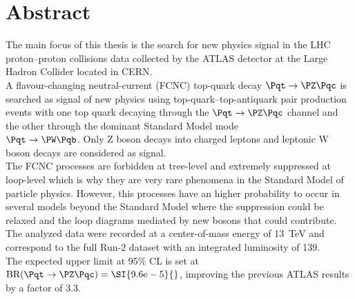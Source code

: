 \chapter*{Abstract}        %

\vspace{-1cm}
The main focus of this thesis is the search for new physics signal in the
LHC proton–proton collisions data collected by the ATLAS detector at 
the Large Hadron Collider located in CERN.\\
A flavour-changing neutral-current (FCNC) top-quark decay
$\Pqt\rightarrow\PZ\Pqc$ is searched as signal of new physics using 
top-quark–top-antiquark pair production events with one top quark 
decaying through the $\Pqt\rightarrow\PZ\Pqc$ channel and the other 
through the dominant Standard Model mode\\ $\Pqt\rightarrow\PW\Pqb$. 
Only Z boson decays into charged leptons and leptonic W boson decays 
are considered as signal.\\
The FCNC processes are forbidden at tree-level and extremely suppressed at loop-level 
which is why they are very rare phenomena in the Standard Model of particle physics.
However, this processes have an higher probability to occur in several models beyond the Standard Model where the suppression could be relaxed and the loop diagrams mediated by new bosons that could contribute.\\
The analyzed data were recorded at a center-of-mass energy of \SI{13}{\TeV} and correspond to the full Run-2 dataset with an integrated luminosity of \SI{139}{\ifb}.\\
The expected upper limit at 95\% CL is set at $\mathrm{BR (\Pqt\rightarrow\PZ\Pqc)=\SI{9.6e-5}{}}$, improving the previous ATLAS results by a factor of 3.3.

\restoregeometry


